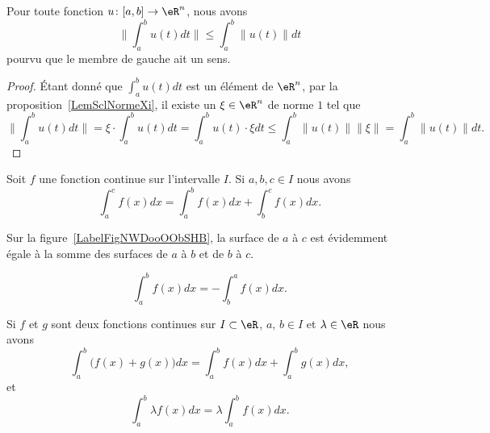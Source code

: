 \begin{lemma}			\label{LemIneqnormeintintnorm}
	Pour toute fonction $u\colon \mathopen[ a , b \mathclose]\to \eR^n$, nous avons
	\begin{equation}
		\| \int_a^bu(t)dt\|\leq\int_a^b\| u(t) \|dt
	\end{equation}
	pourvu que le membre de gauche ait un sens.
\end{lemma}

\begin{proof}
	Étant donné que $\int_a^bu(t)dt$ est un élément de $\eR^n$, par la proposition~\ref{LemSclNormeXi}, il existe un $\xi\in\eR^n$ de norme $1$ tel que
	\begin{equation}
		\| \int_a^bu(t)dt \|=\xi\cdot\int_a^b u(t)dt=\int_a^b u(t)\cdot\xi dt\leq\int_a^b\| u(t) \|   \| \xi \|=\int_a^b\| u(t) \|dt.
	\end{equation}
\end{proof}

\begin{proposition}
    Soit  \( f\) une fonction continue sur l'intervalle \( I\). Si \( a,b,c\in I\) nous avons
    \begin{equation}
        \int_a^cf(x)dx=\int_a^bf(x)dx+\int_b^cf(x)dx.
    \end{equation}
\end{proposition}

Sur la figure~\ref{LabelFigNWDooOObSHB}, la surface de \( a\) à \( c\) est évidemment égale à la somme des surfaces de \( a\) à \( b\) et de \( b\) à \( c\).
\newcommand{\CaptionFigNWDooOObSHB}{Illustration pour les relations de Chasles.}


\begin{corollary}
  \begin{equation}
        \int_a^bf(x)dx=-\int_b^af(x)dx.
    \end{equation}
\end{corollary}

\begin{proposition}\label{lineariteintegrale}
    Si $f$ et $g$ sont deux fonctions continues sur $I\subset\eR$, $a, \, b\in I$ et \( \lambda\in \eR\) nous avons
    \begin{equation}
        \int_a^b\big( f(x)+g(x) \big)dx=\int_a^bf(x)dx+\int_a^bg(x)dx,
    \end{equation}
    et
    \begin{equation}
        \int_a^b \lambda f(x)dx=\lambda\int_a^bf(x)dx.
    \end{equation}
\end{proposition}

